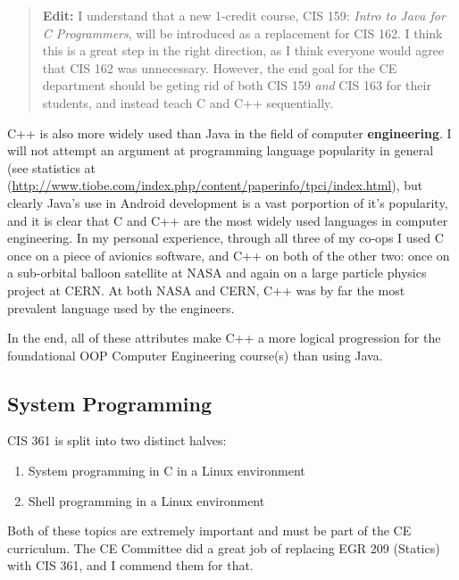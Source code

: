 \documentclass[12pt]{article}
\numberwithin{figure}{section}
\numberwithin{equation}{section}
\begin{document}
{\bigskip

\begin{quote}
\textbf{Edit:} I understand that a new 1-credit course, CIS 159: \emph{Intro to Java for C Programmers}, will be introduced as a replacement for CIS 162. I think this is a great step in the right direction, as I think everyone would agree that CIS 162 was unnecessary. However, the end goal for the CE department should be geting rid of both CIS 159 \emph{and} CIS 163 for their students, and instead teach C and C++ sequentially.
\end{quote}

\bigskip

C++ is also more widely used than Java in the field of computer
\textbf{engineering}. I will not attempt an argument at programming
language popularity in general (see statistics at
(\url{http://www.tiobe.com/index.php/content/paperinfo/tpci/index.html}),
but clearly Java's use in Android development is a vast porportion of
it's popularity, and it is clear that C and C++ are the most widely used
languages in computer engineering. In my personal experience, through
all three of my co-ops I used C once on a piece of avionics software,
and C++ on both of the other two: once on a sub-orbital balloon
satellite at NASA and again on a large particle physics project at CERN.
At both NASA and CERN, C++ was by far the most prevalent language used
by the engineers.

\bigskip

In the end, all of these attributes make C++ a more logical progression for the foundational OOP Computer Engineering course(s) than using Java.

\subsection{System Programming}\label{system-programming}
CIS 361 is split into two distinct halves:

\begin{enumerate}
\itemsep1pt\parskip0pt
\item System programming in C in a Linux environment
\item Shell programming in a Linux environment
\end{enumerate}

Both of these topics are extremely important and must be part of the CE
curriculum. The CE Committee did a great job of replacing EGR 209 (Statics) with CIS 361, and I commend them for that.

}
\end{document}
